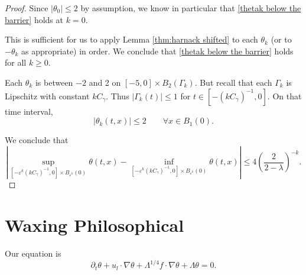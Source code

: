 \documentclass[11pt]{amsart}
\theoremstyle{remark}
\theoremstyle{definition}
\newcommand{\eps}{\varepsilon}
\newcommand{\paren}[1]{\left( #1 \right)}
\newcommand{\abs}[1]{\left\lvert #1 \right\rvert}
\newcommand{\del}{\partial}
\newcommand{\grad}{\nabla}
\newcommand{\n}{^{-1}}
\newcommand{\ulow}{u_l}
\begin{document}
\begin{proof}
Since $|\theta_0|\leq 2$ by assumption, we know in particular that \eqref{thetak below the barrier} holds at $k=0$.  

This is sufficient for us to apply Lemma \ref{thm:harnack shifted} to each $\theta_k$ (or to $-\theta_k$ as appropriate) in order.  We conclude that \eqref{thetak below the barrier} holds for all $k \geq 0$.  

Each $\theta_k$ is between $-2$ and 2 on $[-5,0]\times B_2(\Gamma_k)$.  But recall that each $\Gamma_k$ is Lipschitz with constant $k C_\gamma$.  Thus $|\Gamma_k(t)|\leq 1$ for $t \in [-(k C_\gamma)\n, 0]$.  On that time interval, 
\[ \abs{\theta_k(t,x)} \leq 2 \qquad \forall x \in B_1(0). \]

We conclude that
\[ \abs{ \sup_{[-\eps^k (k C_\gamma)\n, 0] \times B_{\eps^k}(0)} \theta(t,x) - \inf_{[-\eps^k (k C_\gamma)\n, 0] \times B_{\eps^k}(0)} \theta(t,x) } \leq 4 \paren{\frac{2}{2-\lambda}}^{-k}. \]

\end{proof}


\section{Waxing Philosophical}

Our equation is
\[ \del_t \theta + \ulow \cdot \grad \theta + \Lambda^{1/4} f \cdot \grad \theta + \Lambda \theta = 0. \]
\end{document}
